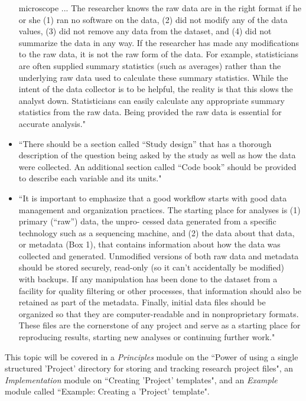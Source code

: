 \documentclass[pdftex,english,11pt,parskip=half]{scrartcl}
\begin{document}
\begin{itemize}
microscope ... The researcher knows the raw data are in the right format if
he or she (1) ran no software on the data, (2) did not modify any of the data values, (3) did not remove any data from the dataset, and (4) did not summarize the data in any way. If the researcher has made any modifications to the raw data, it is not the raw form of the data. For example, statisticians are often supplied summary statistics (such as averages) rather than the underlying raw data used to calculate these summary statistics. While the intent of the data collector is to be helpful, the reality is that this slows the analyst down. Statisticians can easily calculate any appropriate summary statistics from the raw data. Being provided the raw data is essential for accurate analysis." \cite{ellis2018share} 
\item ``There should be a section called “Study design” that has a thorough description of the question being asked by the study as well as how the data were collected. An additional section called “Code book” should be provided to describe each variable and its units." \cite{ellis2018share}
\item ``It is important to emphasize that a good workflow starts with good data management and organization practices. The starting place for analyses is (1) primary (“raw”) data, the unpro- cessed data generated from a specific technology such as a sequencing machine, and (2) the data about that data, or metadata (Box 1), that contains information about how the data was collected and generated. Unmodified versions of both raw data and metadata should be stored securely, read-only (so it can’t accidentally be modified) with backups. If any manipulation has been done to the dataset from a facility for quality filtering or other processes, that information should also be retained as part of the metadata. Finally, initial data files should be organized so that they are computer-readable and in nonproprietary formats. These files are the cornerstone of any project and serve as a starting place for reproducing results, starting new analyses or continuing further work." \cite{shade2015computing}
\end{itemize}

This topic will be
covered in a \textit{Principles} module on the ``Power of using a single
structured 'Project' directory for storing and tracking research project files",
an \textit{Implementation} module on ``Creating 'Project' templates", and an
\textit{Example} module called ``Example: Creating a 'Project' template".
\end{document}

